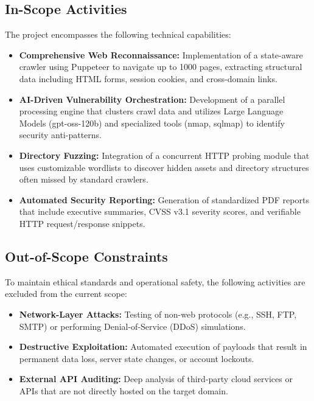 \documentclass[12pt,oneside,a4paper]{book}
\begin{document}
\subsection{In-Scope Activities}
The project encompasses the following technical capabilities:
\begin{itemize}
    \item \textbf{Comprehensive Web Reconnaissance:} Implementation of a state-aware crawler using Puppeteer to navigate up to 1000 pages, extracting structural data including HTML forms, session cookies, and cross-domain links.
    \item \textbf{AI-Driven Vulnerability Orchestration:} Development of a parallel processing engine that clusters crawl data and utilizes Large Language Models (gpt-oss-120b) and specialized tools (nmap, sqlmap) to identify security anti-patterns.
    \item \textbf{Directory Fuzzing:} Integration of a concurrent HTTP probing module that uses customizable wordlists to discover hidden assets and directory structures often missed by standard crawlers.
    \item \textbf{Automated Security Reporting:} Generation of standardized PDF reports that include executive summaries, CVSS v3.1 severity scores, and verifiable HTTP request/response snippets.
\end{itemize}

\subsection{Out-of-Scope Constraints}
To maintain ethical standards and operational safety, the following activities are excluded from the current scope:
\begin{itemize}
    \item \textbf{Network-Layer Attacks:} Testing of non-web protocols (e.g., SSH, FTP, SMTP) or performing Denial-of-Service (DDoS) simulations.
    \item \textbf{Destructive Exploitation:} Automated execution of payloads that result in permanent data loss, server state changes, or account lockouts.
    \item \textbf{External API Auditing:} Deep analysis of third-party cloud services or APIs that are not directly hosted on the target domain.
\end{itemize}
\end{document}
